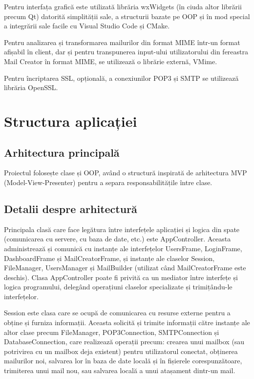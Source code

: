 \documentclass[runningheads]{llncs}
\begin{document}
Pentru interfața grafică este utilizată librăria wxWidgets (în ciuda altor librării precum Qt) datorită simplității sale, a structurii bazate pe OOP și în mod special a integrării sale facile cu Visual Studio Code și CMake.

Pentru analizarea și transformarea mailurilor din format MIME\cite{ref_rfc_mime} într-un format afișabil în client, dar și pentru transpunerea input-ului utilizatorului din fereastra Mail Creator în format MIME, se utilizează o librărie externă, VMime.

Pentru încriptarea SSL, opțională, a conexiunilor POP3 și SMTP se utilizează librăria OpenSSL.


\section{Structura aplicației}


\subsection{Arhitectura principală}

Proiectul folosește clase și OOP, având o structură inspirată de arhitectura MVP (Model-View-Presenter) pentru a separa responsabilitățile între clase.



\subsection{Detalii despre arhitectură}


Principala clasă care face legătura între interfețele aplicației și logica din spate (comunicarea cu servere, cu baza de date, etc.) este AppController. Aceasta administrează și comunică cu instanțe ale interfețelor UsersFrame, LoginFrame, DashboardFrame și MailCreatorFrame, și instanțe ale claselor Session, FileManager, UsersManager și MailBuilder (utilizat când MailCreatorFrame este deschis). Clasa AppController poate fi privită ca un mediator între interfețe și logica programului, delegând operațiuni claselor specializate și trimițându-le interfețelor.

Session este clasa care se ocupă de comunicarea cu resurse externe pentru a obține și furniza informații. Aceasta solicită și trimite informații către instanțe ale altor clase precum FileManager, POP3Connection, SMTPConnection și DatabaseConnection, care realizează operații precum: crearea unui mailbox (sau potrivirea cu un mailbox deja existent) pentru utilizatorul conectat, obținerea mailurilor noi, salvarea lor în baza de date locală și în fișierele corespunzătoare, trimiterea unui mail nou, sau salvarea locală a unui atașament dintr-un mail.
\end{document}
